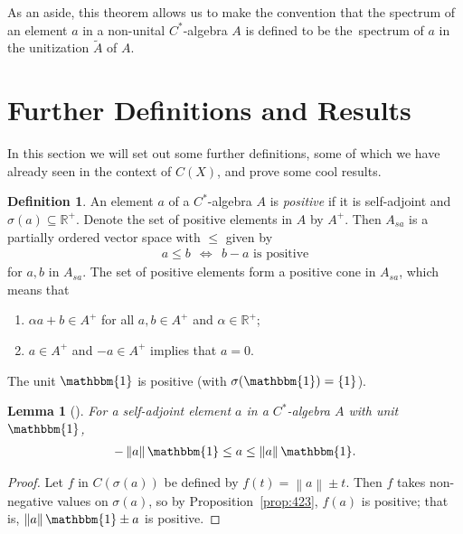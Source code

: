 \documentclass[11pt,a4paper]{report}
\theoremstyle{plain}
\newtheorem{lemma}{Lemma}
\theoremstyle{definition}
\newtheorem*{defn}{Definition}
\newcommand{\1}{\mathbbm{1}}
\newcommand{\R}{\mathbb{R}}
\newcommand{\CX}{C(X)}
\newcommand{\spec}[1]{\sigma(#1)}
\begin{document}
As an aside, this theorem allows us to make the convention that the spectrum of 
an element $a$ in a non-unital $C^\ast$-algebra $A$ is defined to be 
the~spectrum of $a$ in the unitization $\tilde A$ of $A$.





\section{Further Definitions and Results}\label{section:further}
In this section we will set out some further definitions, some of which we have 
already seen in the context of $\CX$, and prove some cool results.


\begin{defn}
	An element $a$ of a $C^\ast$-algebra $A$ is \emph{positive} if it is 
	self-adjoint and $\spec a\subseteq \R^+$. Denote the set of positive elements 
	in $A$ by $A^+$. Then $A_{sa}$ is a partially ordered vector space with $\leq$ 
	given by
	\begin{align*}
		a\leq b ~~\iff~~ b-a \mbox{ is positive}
	\end{align*}
	for $a,b$ in $A_{sa}$.
	The set of positive elements form a positive cone in $A_{sa}$, which means that 
	\begin{enumerate}
		\item 	$\alpha a+b\in A^+$ for all $a,b \in A^+$ and $\alpha\in \R^+$;
		\item	$a\in A^+$ and $-a\in A^+$ implies that $a=0$.
	\end{enumerate}
\end{defn}

The unit $\1$ is positive (with $\spec \1 = \left\{1\right\}$). 

\begin{lemma}[{\cite[4.2.3(ii)]{kadison83}}]\label{lemma:423}
	For a self-adjoint element $a$ in a $C^\ast$-algebra $A$ with unit $\1$, 
	\begin{align*}
		-\left\|a\right\|\1 \leq a\leq\left\|a\right\|\1.
	\end{align*}
\end{lemma}
\begin{proof}
	Let $f$ in $C(\spec a)$ be defined by $f(t) = \left\|a\right\| \pm t$. Then $f$ takes 
	non-negative values on $\spec a$, so by Proposition~\ref{prop:423}, $f(a)$ is 
	positive; that is, $\left\|a\right\|\1 \pm a$ is positive.

\end{proof}
	
\end{document}
